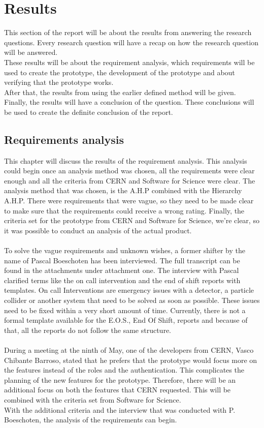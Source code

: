 \documentclass[paper=a4, fontsize=11pt,twoside]{scrartcl}	%
\begin{document}
\section{Results}
This section of the report will be about the results from answering the research questions. Every research question will have a recap on how the research question will be answered. \\
These results will be about the requirement analysis, which requirements will be used to create the prototype, the development of the prototype and about verifying that the prototype works. \\
After that, the results from using the earlier defined method will be given. Finally, the results will have a conclusion of the question. These conclusions will be used to create the definite conclusion of the report.
\newpage
\subsection{Requirements analysis}
This chapter will discuss the results of the requirement analysis. This analysis could begin once an analysis method was chosen, all the requirements were clear enough and all the criteria from CERN and Software for Science were clear. The analysis method that was chosen, is the A.H.P combined with the Hierarchy A.H.P. There were requirements that were vague, so they need to be made clear to make sure that the requirements could receive a wrong rating. Finally, the criteria set for the prototype from CERN and Software for Science, we're clear, so it was possible to conduct an analysis of the actual product. \\ \\
To solve the vague requirements and unknown wishes, a former shifter by the name of Pascal Boeschoten has been interviewed. The full transcript can be found in the attachments under attachment one. The interview with Pascal clarified  terms like the on call intervention and the end of shift reports with templates. On call Interventions are emergency issues with a detector, a particle collider or another system that need to be solved as soon as possible. These issues need to be fixed within a very short amount of time. Currently, there is not a formal template available for the E.O.S., End Of Shift, reports  and because of that, all the reports do not follow the same structure.\\ \\
During a meeting at the ninth of May, one of the developers from CERN, Vasco Chibante Barroso, stated that he prefers that the prototype would focus more on the features instead of the roles and the authentication. This complicates the planning of the new features for the prototype. Therefore, there will be an additional focus on both the features that CERN requested. This will be combined with the criteria set from Software for Science. \\ 
With the additional criteria and the interview that was conducted with P. Boeschoten, the analysis of the requirements can begin. \\ \\
\end{document}
